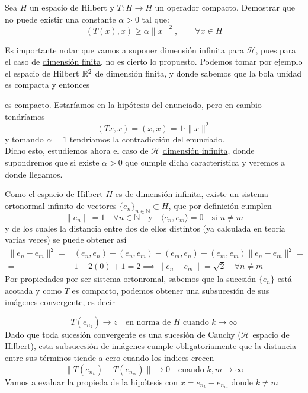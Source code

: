 \begin{ejercicio} 
    Sea $H$ un espacio de Hilbert y $T: H \longrightarrow H$ un operador compacto. Demostrar que no puede existir una constante $\alpha > 0$ tal que:
    \[ ( T(x), x ) \geq \alpha \|x\|^2, \qquad \forall x \in H \]

    \noindent
    Es importante notar que vamos a suponer dimensión infinita para $\mathcal{H}$, pues para el caso de \underline{dimensión finita}, no es cierto lo propuesto. Podemos tomar por ejemplo el espacio de Hilbert $\mathbb{R}^2$ de dimensión finita, y donde sabemos que la bola unidad es compacta y entonces 

    es compacto. Estaríamos en la hipótesis del enunciado, pero en cambio tendríamos
    $$ ( Tx, x ) = ( x, x ) =1\cdot \|x\|^2$$
    y tomando $\alpha=1$ tendríamos la contradicción del enunciado. \\

    \noindent
    Dicho esto, estudiemos ahora el caso de $\mathcal{H}$ \underline{dimensión infinita}, donde supondremos que si existe $\alpha>0$ que cumple dicha característica y veremos a donde llegamos.
    
    \noindent
    Como el espacio de Hilbert $H$ es de dimensión infinita, existe un sistema ortonormal infinito de vectores $\{e_n\}_{n \in \mathbb{N}} \subset H$, que por definición cumplen
    $$\|e_n\| = 1 \quad \forall n \in \mathbb{N} \quad \text{y} \quad \langle e_n, e_m \rangle = 0 \quad \text{si } n \neq m$$
    y de los cuales la distancia entre dos de ellos distintos (ya calculada en teoría varias veces) se puede obtener así
    \begin{align*}
        \|e_n - e_m\|^2 =& ( e_n, e_n ) - ( e_n, e_m ) - ( e_m, e_n ) + ( e_m, e_m )\|e_n - e_m\|^2 = \\
        =& 1 - 2(0) + 1 = 2\implies \|e_n - e_m\| = \sqrt{2} \quad \forall n \neq m
    \end{align*}
    Por propiedades por ser sistema ortonromal, sabemos que la sucesión $\{e_n\}$ está acotada y como $T$ es compacto, podemos obtener una subsucesión de sus imágenes convergente, es decir
    
    $$T(e_{n_k}) \longrightarrow z \quad \text{en norma de } H \text{ cuando } k \to \infty$$   
    \noindent
    Dado que toda sucesión convergente es una sucesión de Cauchy ($\mathcal{H}$ espacio de Hilbert), esta subsucesión de imágenes cumple obligatoriamente que la distancia entre sus términos tiende a cero cuando los índices crecen
    $$\|T(e_{n_k}) - T(e_{n_m})\| \longrightarrow 0 \quad \text{cuando } k, m \to \infty$$
    Vamos a evaluar la propieda de la hipótesis con $x = e_{n_k} - e_{n_m}$ donde $k \neq m$


\end{ejercicio}

